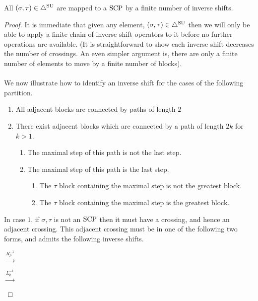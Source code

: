 \begin{lemma}\label{lem:inductive decomposition into SCP}
All $(\sigma,\tau)\in \triangle^{\mathrm{SU}}$ are mapped to a $\mathrm{SCP}$ by a finite number of inverse shifts.
\end{lemma}
\begin{proof}
It is immediate that given any element, $(\sigma,\tau) \in \triangle^{\mathrm{SU}}$ then we will only be able to apply a finite chain of inverse shift operators to it before no further operations are available. (It is straightforward to show each inverse shift decreases the number of crossings. An even simpler argument is, there are only a finite number of elements to move by a finite number of blocks).
\\\\
We now illustrate how to identify an inverse shift for the cases of the following partition.
\begin{enumerate}
    \item All adjacent blocks are connected by paths of length $2$
    \item There exist adjacent blocks which are connected by a path of length $2k$ for $k>1$.
    \begin{enumerate}
        \item The maximal step of this path is not the last step.
        \item The maximal step of this path is the last step.
        \begin{enumerate}
            \item The $\tau$ block containing the maximal step is not the greatest block.
            \item The $\tau$ block containing the maximal step is the greatest block.
        \end{enumerate}
    \end{enumerate}
\end{enumerate}
In case $1$, if $\sigma,\tau$ is not an $\mathrm{SCP}$ then it must have a crossing, and hence an adjacent crossing. This adjacent crossing must be in one of the following two forms, and admits the following inverse shifts.
\begin{center}
$\xrightarrow{R_\rho^{-1}}$
\quad
{}
$\xrightarrow{L_\rho^{-1}}$


\end{center}
\end{proof}
